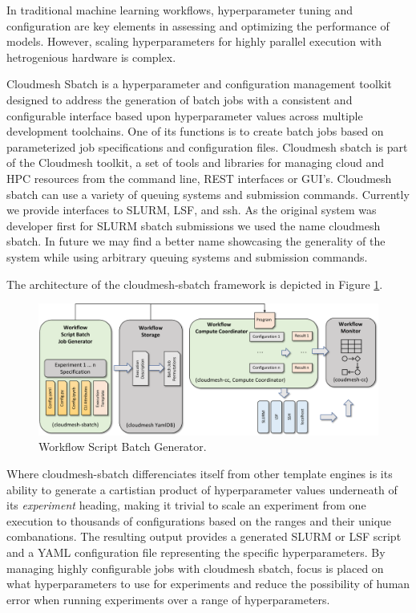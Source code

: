 \documentclass[utf8]{FrontiersinVancouver} %
\begin{document}
In traditional machine learning workflows, hyperparameter tuning and
configuration are key elements in assessing and optimizing the
performance of models. However, scaling hyperparameters for highly
parallel execution with hetrogenious hardware is complex.

Cloudmesh Sbatch is a hyperparameter and configuration management
toolkit designed to address the generation of batch jobs with a
consistent and configurable interface based upon hyperparameter values
across multiple development toolchains. One of its functions is to
create batch jobs based on parameterized job specifications and
configuration files.  Cloudmesh sbatch is part of the Cloudmesh
toolkit, a set of tools and libraries for managing cloud and HPC
resources from the command line, REST interfaces or GUI's.
Cloudmesh sbatch can use a variety of
queuing systems and submission commands. Currently we provide
interfaces to SLURM, LSF, and ssh. As the original system was
developer first for SLURM sbatch submissions we used the name
cloudmesh sbatch. In future we may find a better name showcasing the
generality of the system while using arbitrary queuing systems and
submission commands.

The architecture of the cloudmesh-sbatch framework is depicted in
Figure \ref{fig:cm-sbatch}.

\begin{figure}[htb]
    \centering
    \includegraphics[width=0.70\columnwidth]{images/cloudmesh-sbatch-new.pdf}
    \caption{Workflow Script Batch Generator.}
    \label{fig:cm-sbatch}
\end{figure}


Where cloudmesh-sbatch differenciates itself from other template engines is its
ability to generate a cartistian product of hyperparameter values
underneath of its {\it experiment} heading, making it trivial to
scale an experiment from one execution to thousands of configurations
based on the ranges and their unique combanations.  The resulting
output provides a generated SLURM or LSF script and a YAML
configuration file representing the specific hyperparameters.  By
managing highly configurable jobs with cloudmesh sbatch, focus is
placed on what hyperparameters to use for experiments and reduce the
possibility of human error when running experiments over a range of
hyperparameters.
\end{document}
